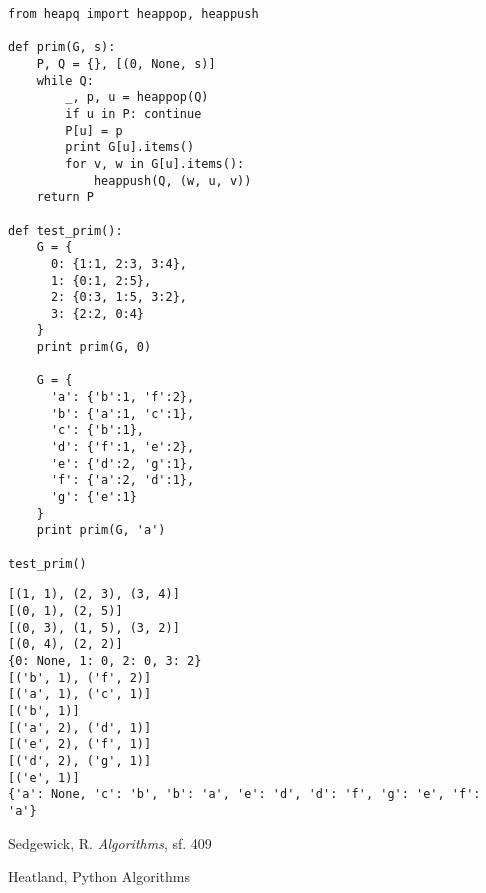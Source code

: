 \documentclass[12pt,fleqn]{article}\usepackage{../common}
\begin{document}
\begin{verbatim}
from heapq import heappop, heappush

def prim(G, s):
    P, Q = {}, [(0, None, s)]
    while Q:
        _, p, u = heappop(Q)
        if u in P: continue
        P[u] = p
        print G[u].items()
        for v, w in G[u].items():
            heappush(Q, (w, u, v))
    return P

def test_prim():    
    G = {
      0: {1:1, 2:3, 3:4},
      1: {0:1, 2:5},
      2: {0:3, 1:5, 3:2},
      3: {2:2, 0:4}
    }
    print prim(G, 0)

    G = {
      'a': {'b':1, 'f':2},
      'b': {'a':1, 'c':1},
      'c': {'b':1},
      'd': {'f':1, 'e':2},
      'e': {'d':2, 'g':1},
      'f': {'a':2, 'd':1},
      'g': {'e':1}
    }
    print prim(G, 'a')

test_prim()
\end{verbatim}

\begin{verbatim}
[(1, 1), (2, 3), (3, 4)]
[(0, 1), (2, 5)]
[(0, 3), (1, 5), (3, 2)]
[(0, 4), (2, 2)]
{0: None, 1: 0, 2: 0, 3: 2}
[('b', 1), ('f', 2)]
[('a', 1), ('c', 1)]
[('b', 1)]
[('a', 2), ('d', 1)]
[('e', 2), ('f', 1)]
[('d', 2), ('g', 1)]
[('e', 1)]
{'a': None, 'c': 'b', 'b': 'a', 'e': 'd', 'd': 'f', 'g': 'e', 'f': 'a'}
\end{verbatim}

Sedgewick, R. {\em Algorithms}, sf. 409

Heatland, Python Algorithms
\end{document}
